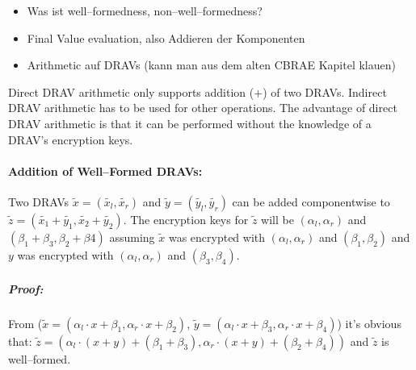 \begin{JWtodoBox}
  \begin{itemize}
    \item Was ist well--formedness, non--well--formedness?
    \item Final Value evaluation, also Addieren der Komponenten
    \item Arithmetic auf DRAVs (kann man aus dem alten CBRAE Kapitel klauen)
  \end{itemize}
\end{JWtodoBox}



Direct DRAV arithmetic only supports addition ($+$) of two DRAVs. Indirect DRAV
arithmetic has to be used for other operations. The advantage of direct DRAV
arithmetic is that it can be performed without the knowledge of a DRAV's
encryption keys.


\paragraph{Addition of Well--Formed DRAVs:} Two DRAVs $\widetilde{x} =
(\widetilde{x_l}, \widetilde{x_r})$ and $\widetilde{y} = (\widetilde{y_l},
\widetilde{y_r})$ can be added componentwise to $\widetilde{z} =
\left(\widetilde{x_1} + \widetilde{y_1}, \widetilde{x_2} +
\widetilde{y_2}\right)$. The encryption keys for $\widetilde{z}$ will be
$(\alpha_l, \alpha_r)$ and $(\beta_1 + \beta_3, \beta_2 + \beta4)$ assuming
$\widetilde{x}$ was encrypted with $(\alpha_l, \alpha_r)$ and $(\beta_1,
\beta_2)$ and $y$ was encrypted with $(\alpha_l, \alpha_r)$ and $(\beta_3,
\beta_4)$.

\subparagraph{Proof:} From ($\widetilde{x} = \left(\alpha_l \cdot x + \beta_1,
\alpha_r \cdot x + \beta_2\right)$, $\widetilde{y} = \left(\alpha_l \cdot x +
\beta_3, \alpha_r \cdot x + \beta_4\right)$) it's obvious that: $\widetilde{z} =
\left(\alpha_l \cdot (x+y) + (\beta_1 + \beta_3), \alpha_r \cdot (x+y) +
(\beta_2 + \beta_4)\right)$ and $\widetilde{z}$ is well--formed.

